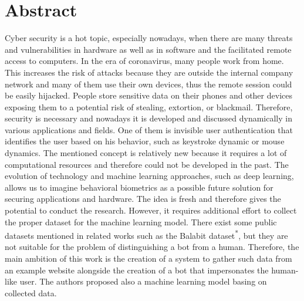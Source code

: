 \section{Abstract}\label{sec:abstract}
Cyber security is a hot topic, especially nowadays, when there are many threats and vulnerabilities in hardware as well as in software and the facilitated remote access to computers.
In the era of coronavirus, many people work from home.
This increases the risk of attacks because they are outside the internal company network and many of them use their own devices, thus the remote session could be easily hijacked.
People store sensitive data on their phones and other devices exposing them to a potential risk of stealing, extortion, or blackmail.
Therefore, security is necessary and nowadays it is developed and discussed dynamically in various applications and fields.
One of them is invisible user authentication that identifies the user based on his behavior, such as keystroke dynamic or mouse dynamics.
The mentioned concept is relatively new because it requires a lot of computational resources and therefore could not be developed in the past.
The evolution of technology and machine learning approaches, such as deep learning, allows us to imagine behavioral biometrics as a possible future solution for securing applications and hardware.
The idea is fresh and therefore gives the potential to conduct the research.
However, it requires additional effort to collect the proper dataset for the machine learning model.
There exist some public datasets mentioned in related works such as the Balabit dataset\textsuperscript{*}, but they are not suitable for the problem of distinguishing a bot from a human.
Therefore, the main ambition of this work is the creation of a system to gather such data from an example website alongside the creation of a bot that impersonates the human-like user.
The authors proposed also a machine learning model basing on collected data.

